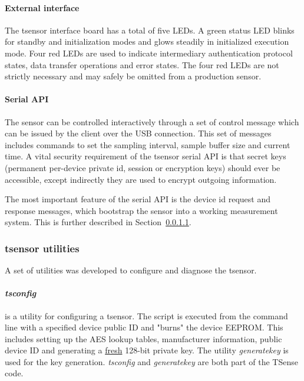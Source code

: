 \paragraph{External interface}

The tsensor interface board has a total of five LEDs. A green status LED blinks for standby and initialization modes and glows steadily in initialized execution mode. Four red LEDs are used to indicate intermediary authentication protocol states, data transfer operations and error states. The four red LEDs are not strictly necessary and may safely be omitted from a production sensor.

\paragraph{Serial API}

The sensor can be controlled interactively through a set of control message which can be issued by the client over the USB connection. This set of messages includes commands to set the sampling interval, sample buffer size and current time. 
A vital security requirement of the tsensor serial API is that secret keys (permanent per-device private id, session or encryption keys) should ever be accessible, except indirectly they are used to encrypt outgoing information.

The most important feature of the serial API is the device id request and response messages, which bootstrap the sensor into a working measurement system. This is further described in Section~\ref{}.

\subsubsection{tsensor utilities}

A set of utilities was developed to configure and diagnose the tsensor.

\paragraph{\textit{tsconfig}} is a utility for configuring a tsensor. The script is executed from the command line with a specified device public ID and "burns" the device EEPROM. This includes setting up the AES lookup tables, manufacturer information, public device ID and generating a \underline{fresh} 128-bit private key. The utility \textit{generatekey} is used for the key generation. \textit{tsconfig} and \textit{generatekey} are both part of the TSense code.

